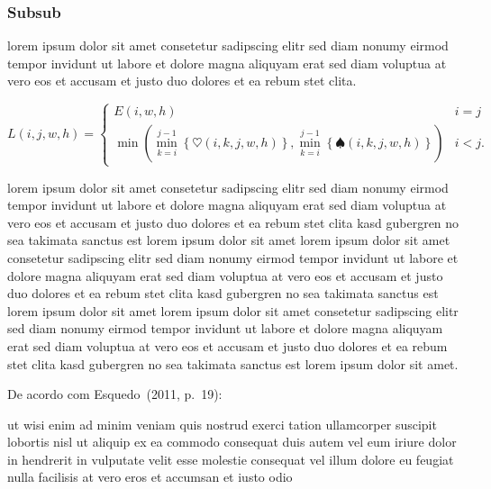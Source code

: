 \subsubsection{Subsub}

lorem ipsum dolor sit amet consetetur sadipscing elitr sed diam nonumy
eirmod tempor invidunt ut labore et dolore magna aliquyam erat sed diam
voluptua at vero eos et accusam et justo duo dolores et ea rebum
stet clita.~\cite{GOLDENBERGAPL02}

\begin{equation}\label{eq:apl}%
    L\left(i,j,w,h\right)=
    \begin{cases}
      E\left(i,w,h\right) & i=j\\
      \min\left(\min_{k=i}^{j-1}\left\{\heartsuit\left(i,k,j,w,h\right)\right\},
                \min_{k=i}^{j-1}\left\{\spadesuit\left(i,k,j,w,h\right)\right\}\right) & i<j\text{.}
    \end{cases}
\end{equation}

lorem ipsum dolor sit amet consetetur sadipscing elitr sed diam nonumy
eirmod tempor invidunt ut labore et dolore magna aliquyam erat sed diam
voluptua at vero eos et accusam et justo duo dolores et ea rebum stet clita
kasd gubergren no sea takimata sanctus est lorem ipsum dolor sit amet lorem
ipsum dolor sit amet consetetur sadipscing elitr sed diam nonumy eirmod
tempor invidunt ut labore et dolore magna aliquyam erat sed diam voluptua at
vero eos et accusam et justo duo dolores et ea rebum stet clita kasd
gubergren no sea takimata sanctus est lorem ipsum dolor sit amet lorem ipsum
dolor sit amet consetetur sadipscing elitr sed diam nonumy eirmod tempor
invidunt ut labore et dolore magna aliquyam erat sed diam voluptua at vero
eos et accusam et justo duo dolores et ea rebum stet clita kasd gubergren no
sea takimata sanctus est lorem ipsum dolor sit amet.

%
De acordo com Esquedo~(2011, p.~19):

\begin{directcite}
ut wisi enim ad minim veniam quis nostrud exerci tation ullamcorper suscipit
lobortis nisl ut aliquip ex ea commodo consequat duis autem vel eum iriure
dolor in hendrerit in vulputate velit esse molestie consequat vel illum
dolore eu feugiat nulla facilisis at vero eros et accumsan et
iusto odio
\end{directcite}

